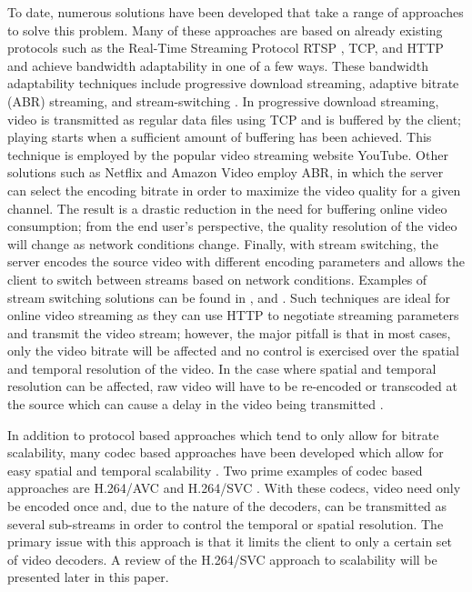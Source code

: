 \documentclass[a4paper,12pt]{article}
\begin{document}
To date, numerous solutions have been developed that take a range of approaches to solve this problem. Many of these approaches are based on already existing protocols such as the Real-Time Streaming Protocol RTSP \cite{RTSP}, TCP, and HTTP \cite{HASQoE, Apple, Microsoft, Netflix} and achieve bandwidth adaptability in one of a few ways. These bandwidth adaptability techniques include progressive download streaming, adaptive bitrate (ABR) streaming, and stream-switching \cite{FeedbackControl}. In progressive download streaming, video is transmitted as regular data files using TCP and is buffered by the client; playing starts when a sufficient amount of buffering has been achieved. This technique is employed by the popular video streaming website YouTube. Other solutions such as Netflix and Amazon Video employ ABR, in which the server can select the encoding bitrate in order to maximize the video quality for a given channel. The result is a drastic reduction in the need for buffering online video consumption; from the end user's perspective, the quality resolution of the video will change as network conditions change. Finally, with stream switching, the server encodes the source video with different encoding parameters and allows the client to switch between streams based on network conditions. Examples of stream switching solutions can be found in \cite{FeedbackControl},\cite{Apple} and \cite{Microsoft}. Such techniques are ideal for online video streaming as they can use HTTP to negotiate streaming parameters and transmit the video stream; however, the major pitfall is that in most cases, only the video bitrate will be affected and no control is exercised over the spatial and temporal resolution of the video. In the case where spatial and temporal resolution can be affected, raw video will have to be re-encoded or transcoded at the source which can cause a delay in the video being transmitted \cite{FeedbackControl}.

In addition to protocol based approaches which tend to only allow for bitrate scalability, many codec based approaches have been developed which allow for easy spatial and temporal scalability \cite{SVCAdvances}. Two prime examples of codec based approaches are H.264/AVC and H.264/SVC \cite{SVCOverview}\cite{SVCTutorial}. With these codecs, video need only be encoded once and, due to the nature of the decoders, can be transmitted as several sub-streams in order to control the temporal or spatial resolution. The primary issue with this approach is that it limits the client to only a certain set of video decoders. A review of the H.264/SVC approach to scalability will be presented later in this paper.
\end{document}
